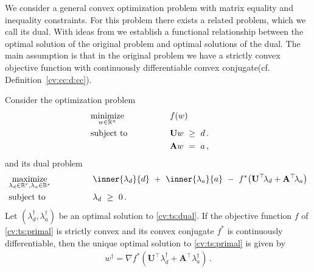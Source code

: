 We consider a general convex optimization problem 
with matrix equality and inequality constraints.
For this problem there exists a related problem,
which we call its dual.
With ideas from \cite{Tseng1991} we establish 
a functional relationship
between the optimal solution of the original problem 
and
optimal solutions of the dual.
The main assumption is that in the original problem we have a strictly convex objective function 
with continuously differentiable 
convex conjugate(cf. Definition~\ref{cv:cc:d:cc}). 
\begin{ftheorem}
  \label{cv:ts:th}
  Consider the optimization problem
\begin{align}
  \label{cv:ts:primal}
    &\underset{w \in \R^n}
    {\mathrm{minimize}}
    &&\qquad\qquad
    f(w)
    &&&
    \\
    \nonumber
    &\mathrm{subject}\ \mathrm{to} 
    &&\qquad\qquad
    \mathbf{U}w
    \ 
    \ge
    \ 
    d
    \,.
    \\
    \nonumber
    &
    &&\qquad\qquad
    \mathbf{A}w
    \ 
    =
    \ 
    a
    \,,
\end{align}
and its dual problem
  \begin{alignat}{2}
    \label{cv:ts:dual}
    &\underset{
    \lambda_d \in \R^r
,
    \lambda_a \in \R^s
  }
    {\mathrm{maximize}}
    &&\qquad\qquad
    \inner
    {\lambda_d}
    {d}
    \ 
    +
    \ 
    \inner
    {\lambda_a}
    {a}
    \ 
    -
    \ 
    f^*
    \!
    \left( 
      \mathbf{U}^\top \! \lambda_d
      +
      \mathbf{A}^\top \! \lambda_a
    \right)
    \\
    \nonumber
    &\mathrm{subject}\ \mathrm{to} 
    &&\qquad\qquad
    \lambda_d
    \ 
    \ge
    \ 
    0
    \,.
\end{alignat}
  Let 
$
(\lambda_d^\dagger,\lambda_a^\dagger)
$
be an optimal solution to \eqref{cv:ts:dual}.
If the objective function $f$ of 
\eqref{cv:ts:primal} is strictly convex and its
convex conjugate $f^*$ is continuously differentiable,
then the unique optimal solution to 
\eqref{cv:ts:primal}
is given by
\begin{gather}
  w^\dagger
  =
  \nabla
    f^*
    \!
    \left( 
      \mathbf{U}^\top  \lambda_d^\dagger
      +
      \mathbf{A}^\top  \lambda_a^\dagger
    \right)
    \,.
\end{gather}
\end{ftheorem}

